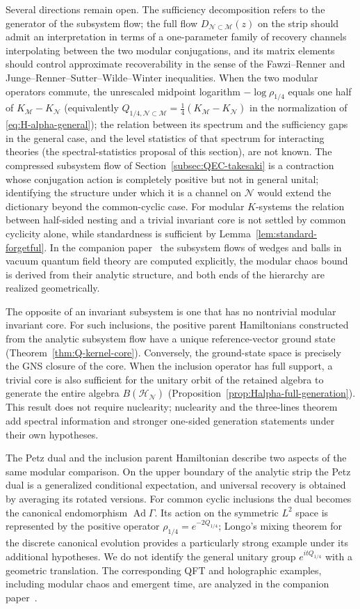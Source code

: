 \documentclass[a4paper,11pt]{article}
\theoremstyle{definition}
\newcommand{\mN}{\mathcal{N}}
\newcommand{\mH}{\mathcal{H}}
\newcommand{\mM}{\mathcal{M}}
\begin{document}
Several directions remain open. The sufficiency decomposition refers to the generator of the subsystem flow; the full flow $D_{\mN\subset\mM}(z)$ on the strip should admit an interpretation in terms of a one-parameter family of recovery channels interpolating between the two modular conjugations, and its matrix elements should control approximate recoverability in the sense of the Fawzi--Renner and Junge--Renner--Sutter--Wilde--Winter inequalities. When the two modular operators commute, the unrescaled midpoint logarithm $-\log\rho_{1/4}$ equals one half of $K_{\mM}-K_{\mN}$ (equivalently $Q_{1/4,\mN\subset\mM}=\tfrac14(K_{\mM}-K_{\mN})$ in the normalization of \eqref{eq:H-alpha-general}); the relation between its spectrum and the sufficiency gaps in the general case, and the level statistics of that spectrum for interacting theories (the spectral-statistics proposal of this section), are not known. The compressed subsystem flow of Section~\ref{subsec:QEC-takesaki} is a contraction whose conjugation action is completely positive but not in general unital; identifying the structure under which it is a channel on $\mN$ would extend the dictionary beyond the common-cyclic case. For modular $K$-systems the relation between half-sided nesting and a trivial invariant core is not settled by common cyclicity alone, while standardness is sufficient by Lemma~\ref{lem:standard-forgetful}. In the companion paper~\cite{companionQFT} the subsystem flows of wedges and balls in vacuum quantum field theory are computed explicitly, the modular chaos bound is derived from their analytic structure, and both ends of the hierarchy are realized geometrically.

The opposite of an invariant subsystem is one that has no nontrivial modular invariant core. For such inclusions, the positive parent Hamiltonians constructed from the analytic subsystem flow have a unique reference-vector ground state (Theorem~\ref{thm:Q-kernel-core}). Conversely, the ground-state space is precisely the GNS closure of the core. When the inclusion operator has full support, a trivial core is also sufficient for the unitary orbit of the retained algebra to generate the entire algebra $B(\mH_{\mN})$ (Proposition~\ref{prop:Halpha-full-generation}). This result does not require nuclearity; nuclearity and the three-lines theorem add spectral information and stronger one-sided generation statements under their own hypotheses.

The Petz dual and the inclusion parent Hamiltonian describe two aspects of the same modular comparison. On the upper boundary of the analytic strip the Petz dual is a generalized conditional expectation, and universal recovery is obtained by averaging its rotated versions. For common cyclic inclusions the dual becomes the canonical endomorphism $\operatorname{Ad}\Gamma$. Its action on the symmetric $L^2$ space is represented by the positive operator $\rho_{1/4}=e^{-2Q_{1/4}}$; Longo's mixing theorem for the discrete canonical evolution provides a particularly strong example under its additional hypotheses. We do not identify the general unitary group $e^{itQ_{1/4}}$ with a geometric translation. The corresponding QFT and holographic examples, including modular chaos and emergent time, are analyzed in the companion paper~\cite{companionQFT}.
\end{document}
